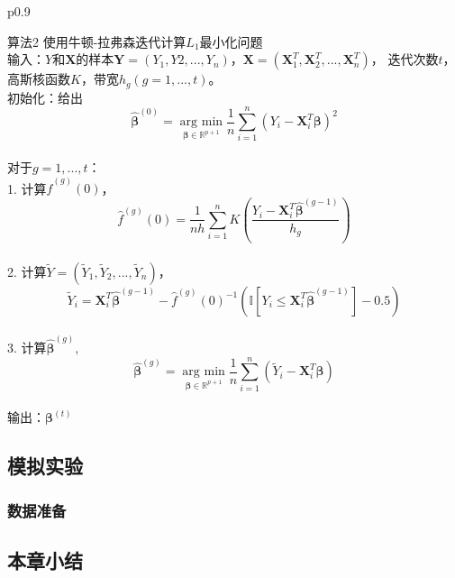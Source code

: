\begin{table}[H]%
    \centering%
    \begin{tabular}{{p{0.9\columnwidth}}}%
    
    \toprule%
    算法2 使用牛顿-拉弗森迭代计算$L_1$最小化问题\\
    \midrule%
    输入：$Y$和$\bm{X}$的样本$\bm{Y} = (Y_1, Y2, ..., Y_n)$，$\bm{X} = (\bm{X}^T_1, \bm{X}^T_2, ..., \bm{X}^T_n)$，
    迭代次数$t$，高斯核函数$K$，带宽$h_g(g = 1, ..., t)。$
    \\
    初始化：给出$$\hat{\bm{\beta}}^{(0)} = \underset{\bm{\beta} \in \mathbb{R}^{p+1}}{\operatorname{arg\ min}}
    \frac1{n}\sum_{i=1}^n (Y_i - \bm{X}_i^T\bm{\beta})^2$$
    \\
    对于$g = 1, ..., t$：
    \\
        1. 计算$\hat{f}^{(g)}(0)$，
        $$
        \hat{f}^{(g)}(0) = \frac1{nh}\sum_{i=1}^{n}K(\frac{Y_i - \bm{X}_i^T\hat{\bm{\beta}}^{(g-1)}}{h_g})
        $$
    \\
        2. 计算$\tilde{Y} = (\tilde Y_1, \tilde Y_2, ..., \tilde Y_n)$，
        $$
        \tilde{Y}_i = \bm{X}^T_i\hat{\bm{\beta}}^{(g-1)} - \hat{f}^{(g)}(0)^{-1}
        (\mathbb{I}[Y_i \leq \bm{X}_i^T \hat{\bm{\beta}}^{(g-1)}] - 0.5)
        $$
    \\
        3. 计算$\hat{\bm{\beta}}^{(g)}$,
        $$
        \hat{\bm{\beta}}^{(g)} = \underset{\bm{\beta} \in \mathbb{R}^{p+1}}{\operatorname{arg\ min}}
        \frac1{n}\sum_{i=1}^n (\tilde{Y}_i - \bm{X}_i^T\bm{\beta})
        $$
    \\
    输出：$\bm{\beta}^{(t)}$
    \\
    \bottomrule%
    \end{tabular}
\end{table}%


\subsection{模拟实验}
\subsubsection{数据准备}


\subsection{本章小结}